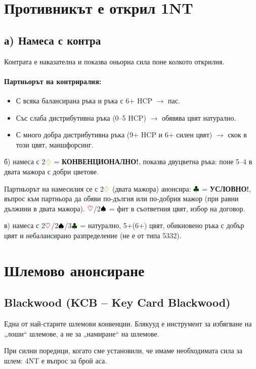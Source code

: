 \documentclass[10pt,a5paper]{extarticle}
\newcommand{\Rheart}{\textcolor{red}{\heartsuit}}
\newcommand{\Rdiamond}{\textcolor{orange}{\diamondsuit}}
\newcommand{\Bspade}{\textcolor{black}{\spadesuit}}
\newcommand{\Bclub}{\textcolor{darkgreen}{\clubsuit}}
\begin{document}
\section{Противникът е открил 1NT}

\subsection*{а) Намеса с контра}
Контрата е наказателна и показва оньорна сила поне колкото открилия.

\paragraph{Партньорът на контриралия:}
\begin{itemize}
  \item[] С всяка балансирана ръка и ръка с 6+ HCP $\rightarrow$ пас.  
  \item[] Със слаба дистрибутивна ръка (0--5 HCP) $\rightarrow$ обявява цвят натурално.  
  \item[] С много добра дистрибутивна ръка (9+ HCP и 6+ силен цвят) $\rightarrow$ скок в този цвят, маншфорсинг.  
\end{itemize}
\newpage
б) намеса с 2$\Rdiamond$ = \textbf{КОНВЕНЦИОНАЛНО!}, показва двуцветна ръка:   
поне 5--4 в двата мажора с добри цветове.  

Партньорът на намесилия се с 2$\Rdiamond$ (двата мажора) анонсира:  
$\Bclub$ = \textbf{УСЛОВНО!}, въпрос към партньора да обяви по-дългия или по-добрия мажор (при равни дължини в двата мажора).  
$\Rheart$/2$\Bspade$ = фит в съответния цвят, избор на договор.  

в) намеса с 2$\Rheart$/2$\Bspade$/3$\Bclub$ = натурално, 5+(6+) цвят, обикновено ръка с добър цвят и небалансирано разпределение (не е от типа 5332).  

\section{Шлемово анонсиране}

\subsection{Blackwood (KCB -- Key Card Blackwood)}  
Една от най-старите шлемови конвенции. Блякууд е инструмент за избягване на „лоши“ шлемове, а не за „намиране“ на шлемове.  

При силни поредици, когато сме установили, че имаме необходимата сила за шлем:  
4NT е въпрос за брой аса.  
\end{document}
